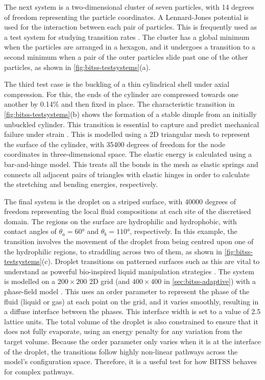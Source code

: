 The next system is a two-dimensional cluster of seven particles, with 14 degrees of freedom representing the particle coordinates.
A Lennard-Jones potential is used for the interaction between each pair of particles.
This is frequently used as a test system for studying transition rates \cite{Wales2002,Passerone2001}.
The cluster has a global minimum when the particles are arranged in a hexagon, and it undergoes a transition to a second minimum when a pair of the outer particles slide past one of the other particles, as shown in \cref{fig:bitss-testsystems}(a).

The third test case is the buckling of a thin cylindrical shell under axial compression.
For this, the ends of the cylinder are compressed towards one another by 0.14\% and then fixed in place.
The characteristic transition in \cref{fig:bitss-testsystems}(b) shows the formation of a stable dimple from an initially unbuckled cylinder.
This transition is essential to capture and predict mechanical failure under strain \cite{Panter2019,Virot2017}.
This is modelled using a 2D triangular mesh to represent the surface of the cylinder, with \num{35400} degrees of freedom for the node coordinates in three-dimensional space.
The elastic energy is calculated using a bar-and-hinge model.
This treats all the bonds in the mesh as elastic springs and connects all adjacent pairs of triangles with elastic hinges in order to calculate the stretching and bending energies, respectively.

The final system is the droplet on a striped surface, with \num{40000} degrees of freedom representing the local fluid compositions at each site of the discretised domain.
The regions on the surface are hydrophilic and hydrophobic, with contact angles of $\theta_a=60\si{\degree}$ and $\theta_b=110\si{\degree}$, respectively.
In this example, the transition involves the movement of the droplet from being centred upon one of the hydrophilic regions, to straddling across two of them, as shown in \cref{fig:bitss-testsystems}(c).
Droplet transitions on patterned surfaces such as this are vital to understand as powerful bio-inspired liquid manipulation strategies \cite{Kusumaatmaja2006,Brown2016}.
The system is modelled on a $200\times200$ 2D grid (and $400\times400$ in \cref{sec:bitss-adaptive}) with a phase-field model \cite{Panter2019a}.
This uses an order parameter to represent the phase of the fluid (liquid or gas) at each point on the grid, and it varies smoothly, resulting in a diffuse interface between the phases.
This interface width is set to a value of 2.5 lattice units.
The total volume of the droplet is also constrained to ensure that it does not fully evaporate, using an energy penalty for any variation from the target volume.
Because the order parameter only varies when it is at the interface of the droplet, the transitions follow highly non-linear pathways across the model's configuration space.
Therefore, it is a useful test for how BITSS behaves for complex pathways.

